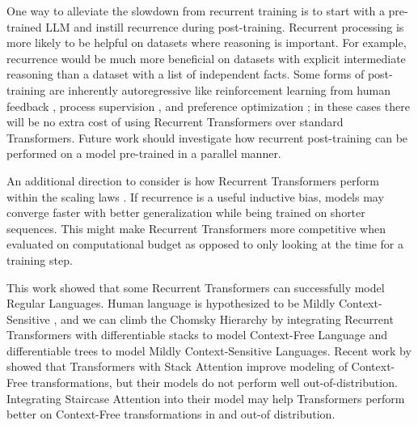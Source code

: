     One way to alleviate the slowdown from recurrent training is to start with a pre-trained LLM and instill recurrence during post-training. Recurrent processing is more likely to be helpful on datasets where reasoning is important. For example, recurrence would be much more beneficial on datasets with explicit intermediate reasoning \citep{nye_show_2021, wei_chain_2022} than a dataset with a list of independent facts. Some forms of post-training are inherently autoregressive like reinforcement learning from human feedback \citep{christiano_deep_2017}, process supervision \citep{lightman_lets_2024}, and preference optimization \citep{pang_iterative_2024}; in these cases there will be no extra cost of using Recurrent Transformers over standard Transformers. Future work should investigate how recurrent post-training can be performed on a model pre-trained in a parallel manner.
    
    An additional direction to consider is how Recurrent Transformers perform within the scaling laws \citep{kaplan_scaling_2020, hoffmann_training_2022}. If recurrence is a useful inductive bias, models may converge faster with better generalization while being trained on shorter sequences. This might make Recurrent Transformers more competitive when evaluated on computational budget as opposed to only looking at the time for a training step.
    
    This work showed that some Recurrent Transformers can successfully model Regular Languages. Human language is hypothesized to be Mildly Context-Sensitive \citep{joshi_tree_1985, joshi_convergence_1990}, and we can climb the Chomsky Hierarchy \citep{chomsky_three_1956, chomsky_certain_1959} by integrating Recurrent Transformers with differentiable stacks \citep{joulin_inferring_2015, grefenstette_learning_2015} to model Context-Free Language and differentiable trees \citep{soulos_differentiable_2023} to model Mildly Context-Sensitive Languages. Recent work by \citet{dusell_stack_2024} showed that Transformers with Stack Attention improve modeling of Context-Free transformations, but their models do not perform well out-of-distribution. Integrating Staircase Attention into their model may help Transformers perform better on Context-Free transformations in and out-of distribution.
    